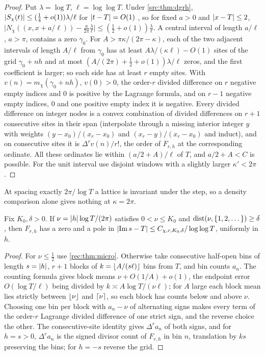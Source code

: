 \begin{proof}
Put $\lambda=\log T$, $\ell=\log\log T$. Under \cref{src:thm:dgrh}, $\lvert S_\chi(t)\rvert\le(\tfrac14+o(1))\lambda/\ell$ for
$\lvert t-T\rvert=O(1)$ \cite{CarneiroChandeeMilinovich2015Note}, so for fixed $a>0$ and $\lvert x-T\rvert\le2$,
$\bigl\lvert N_\chi((x,x+a/\ell))-\frac a{2\pi}\frac\lambda\ell\bigr\rvert\le(\tfrac12+o(1))\frac\lambda\ell$. A central interval of length
$a/\ell$, $a>\pi$, contains a zero $\gamma_0$. For $A>\pi\kappa/(2\pi-\kappa)$, each of the two adjacent intervals
of length $A/\ell$ from $\gamma_0$ has at least $A\lambda/(\kappa\ell)-O(1)$ sites of the grid $\gamma_0+nh$ and at most
$(A/(2\pi)+\tfrac12+o(1))\lambda/\ell$ zeros, and the first coefficient is larger; so each side has at least
$r$ empty sites. With $v(n)=m_\chi(\gamma_0+nh)$, $v(0)>0$, the order-$r$ divided difference on $r$
negative empty indices and $0$ is positive by the Lagrange formula, and on $r-1$ negative empty
indices, $0$ and one positive empty index it is negative. Every divided difference on integer
nodes is a convex combination of divided differences on $r+1$ consecutive sites in their span
(interpolate through a missing interior integer $y$ with weights $(y-x_0)/(x_r-x_0)$ and
$(x_r-y)/(x_r-x_0)$ and induct), and on consecutive sites it is $\Delta^rv(n)/r!$, the order of
$F_{r,h}$ at the corresponding ordinate. All these ordinates lie within $(a/2+A)/\ell$ of $T$, and
$a/2+A<C$ is possible. For the unit interval use disjoint windows with a slightly larger $\kappa'<2\pi$.
\end{proof}

At spacing exactly $2\pi/\log T$ a lattice is invariant under the step, so a density comparison
alone gives nothing at $\kappa=2\pi$.

\begin{corollary}\label{rec:cor:nonres}
Fix $K_0,\delta>0$. If $\nu=\lvert h\rvert\log T/(2\pi)$ satisfies $0<\nu\le K_0$ and $\operatorname{dist}(\nu,\{1,2,\dots\})\ge\delta$,
then $F_{r,h}$ has a zero and a pole in $\lvert\operatorname{Im} s-T\rvert\le C_{\chi,r,K_0,\delta}/\log\log T$, uniformly in $h$.
\end{corollary}

\begin{proof}
For $\nu\le\tfrac12$ use \cref{rec:thm:micro}. Otherwise take consecutive half-open bins of length
$s=\lvert h\rvert$, $r+1$ blocks of $k=\lfloor A/(s\ell)\rfloor$ bins from $T$, and bin counts $a_n$. The counting formula
gives block means $\nu+O(1/A)+o(1)$, the endpoint error $O(\log T/\ell)$ being divided by
$k\asymp A\log T/(\nu\ell)$; for $A$ large each block mean lies strictly between $\lfloor\nu\rfloor$ and $\lceil\nu\rceil$, so
each block has counts below and above $\nu$. Choosing one bin per block with $a_n-\nu$ of alternating
signs makes every term of the order-$r$ Lagrange divided difference of one strict sign, and the
reverse choice the other. The consecutive-site identity gives $\Delta^ra_n$ of both signs, and for
$h=s>0$, $\Delta^ra_n$ is the signed divisor count of $F_{r,h}$ in bin $n$, translation by $ks$ preserving the
bins; for $h=-s$ reverse the grid.
\end{proof}

